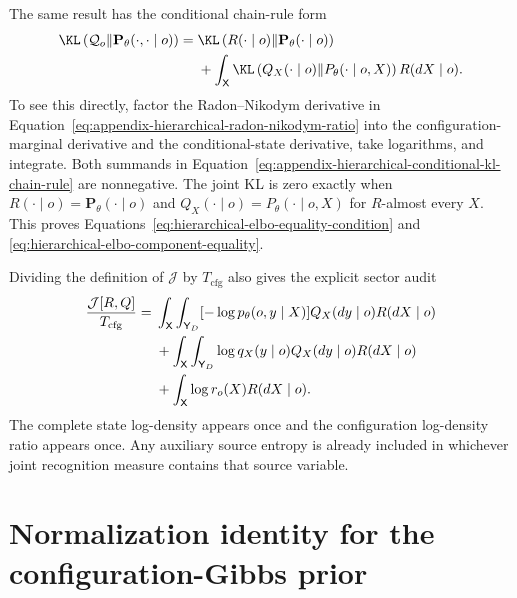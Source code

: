 The same result has the conditional chain-rule form
\begin{align}
\KL\left(
\mathcal Q_o
\middle\Vert
\mathbf P_\theta(\mathord\cdot,\mathord\cdot\mid o)
\right)
={}&
\KL\left(
R(\mathord\cdot\mid o)
\middle\Vert
\mathbf P_\theta(\mathord\cdot\mid o)
\right)
\label{eq:appendix-hierarchical-conditional-kl-chain-rule}\\
&+\int_{\mathsf X}
\KL\left(
Q_X(\mathord\cdot\mid o)
\middle\Vert
P_\theta(\mathord\cdot\mid o,X)
\right)
R(dX\mid o).
\notag
\end{align}
To see this directly, factor the Radon--Nikodym derivative in Equation~\eqref{eq:appendix-hierarchical-radon-nikodym-ratio} into the configuration-marginal derivative and the conditional-state derivative, take logarithms, and integrate. Both summands in Equation~\eqref{eq:appendix-hierarchical-conditional-kl-chain-rule} are nonnegative. The joint KL is zero exactly when
\(R(\mathord\cdot\mid o)=\mathbf P_\theta(\mathord\cdot\mid o)\) and
\(Q_X(\mathord\cdot\mid o)=P_\theta(\mathord\cdot\mid o,X)\) for \(R\)-almost every \(X\). This proves Equations~\eqref{eq:hierarchical-elbo-equality-condition} and \eqref{eq:hierarchical-elbo-component-equality}.

Dividing the definition of \(\mathcal J\) by \(T_{\mathrm{cfg}}\) also gives the explicit sector audit
\begin{align}
\frac{\mathcal J[R,Q]}{T_{\mathrm{cfg}}}
={}&
\int_{\mathsf X}\int_{\mathsf Y_D}
[-\log p_\theta(o,y\mid X)]Q_X(dy\mid o)R(dX\mid o)
\notag\\
&+\int_{\mathsf X}\int_{\mathsf Y_D}
\log q_X(y\mid o)Q_X(dy\mid o)R(dX\mid o)
\label{eq:appendix-hierarchical-entropy-sector-audit}\\
&+\int_{\mathsf X}
\log r_o(X)R(dX\mid o).
\notag
\end{align}
The complete state log-density appears once and the configuration log-density ratio appears once. Any auxiliary source entropy is already included in whichever joint recognition measure contains that source variable.

\section{Normalization identity for the configuration-Gibbs prior}
\label{sec:configuration-gibbs-proof}

